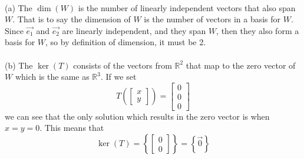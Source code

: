 \documentclass{report}
\begin{document}
\sol \\
(a) The $\operatorname{dim}(W)$ is the number of linearly independent vectors that also span $W$. That is to say the dimension of $W$ is the number of vectors in a basis for $W$. Since $\vec{e_1}$ and $\vec{e_2}$ are linearly independent, and they span $W$, then they also form a basis for $W$, so by definition of dimension, it must be 2. \\
\\
\noindent (b) The $\operatorname{ker}(T)$ consists of the vectors from $\mathbb{R}^2$ that map to the zero vector of $W$ which is the same as $\mathbb{R}^3$. If we set $$
T(\begin{bmatrix} x \\ y \end{bmatrix}) = \begin{bmatrix} 0 \\ 0 \\ 0 \end{bmatrix}
$$ we can see that the only solution which results in the zero vector is when $x = y = 0$. This means that $$\operatorname{ker}(T) = \left\{\begin{bmatrix} 0 \\ 0 \end{bmatrix}\right\} = \left\{\vec{0}\right\}$$
\end{document}
